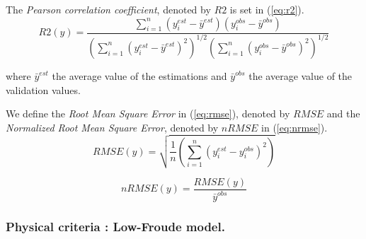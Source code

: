  The \textit{Pearson correlation coefficient}, denoted by $R2$ is set in (\ref{eq:r2}).
\begin{equation}
    R2(y) = \frac{\sum_{i=1}^{n}(y^{est}_i - \bar y^{est}) (y^{obs}_i - \bar y^{obs})} {\left(\sum_{i=1}^{n}(y^{est}_i - \bar y^{est})^2\right)^{1/2}\left(\sum_{i=1}^{n}(y^{obs}_i - \bar y^{obs})^2\right)^{1/2}}
    \label{eq:r2}
\end{equation}

where $\bar y^{est}$ the average value of the estimations and $\bar y^{obs}$ the average value of the validation values.\newline

We define the \textit{Root Mean Square Error} in (\ref{eq:rmse}), denoted by $RMSE$ and the \textit{Normalized Root Mean Square Error}, denoted by $nRMSE$ in (\ref{eq:nrmse}).
\begin{equation}
    RMSE(y) = \sqrt {\frac{1}{n} \left( \sum^n_{i=1}(y^{est}_i - y^{obs}_i)^2 \right)}
    \label{eq:rmse}
\end{equation}

\begin{equation}
    nRMSE(y) = \frac{RMSE(y)} {\bar y^{obs}}
    \label{eq:nrmse}
\end{equation}




\subsubsection{Physical criteria : Low-Froude model.}

